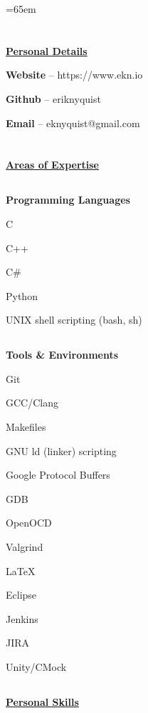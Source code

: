 \documentclass[6pt]{article}
\begin{document}
%
%
\hspace*{-\parindent}%
\begin{minipage}{15em}
\textheight=65em
\section*{}
{\selectfont \underline{\textbf{Personal Details}}}
\break

{\small {\bfseries Website} -- https://www.ekn.io

{\bfseries Github} -- eriknyquist

{\bfseries Email} -- eknyquist@gmail.com}

\section*{}
{\selectfont \underline{\textbf{Areas of Expertise}}}
\subsection*{}
{\textbf{Programming Languages}}

{\small C

C++

C\#

Python

UNIX shell scripting (bash, sh)}

\subsection*{}
{\textbf{Tools \& Environments}}

{\small Git

GCC/Clang

Makefiles

GNU ld (linker) scripting

Google Protocol Buffers

GDB

OpenOCD

Valgrind

{\LaTeX}

Eclipse

Jenkins

JIRA

Unity/CMock}

\subsection*{}
{\selectfont \underline{\textbf{Personal Skills}}}


\end{minipage}
\end{document}
